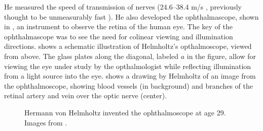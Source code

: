 He measured the speed of transmission of nerves (24.6--38.4 m/s \cite{wikiHelmholtz2021}, previously thought to be unmeasurably fast \cite{Shapin2019}).  He also developed the ophthalmascope, shown in \fig{\ref{fig:helmholtz}}, an instrument to observe the retina of the human eye. The key of the ophthalmascope was to see the need for colinear viewing and illumination directions.  shows a schematic illustration of Helmholtz's opthalmoscope, viewed from above.  The glass plates along the diagonal, labeled $a$ in the figure, allow for viewing the eye under study by the opthalmologist while reflecting illumination from a light source into the eye.  shows a drawing by Helmholtz of an image from the ophthalmoscope, showing blood vessels (in background) and branches of the retinal artery and vein over the optic nerve (center).


\begin{figure}[t]
    \centerline{
    }
    \caption{Hermann von Helmholtz invented the ophthalmoscope at age 29.
        Images from \cite{Helmholtz1925}.}
    \label{fig:helmholtz}
\end{figure}


